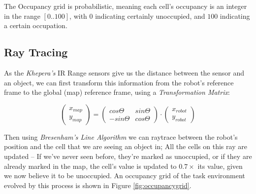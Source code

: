 \documentclass[11pt, a4paper]{article}
\begin{document}
The Occupancy grid is probabilistic, meaning each cell's occupancy is an integer in the range 
${[0..100]}$, with $0$ indicating certainly unoccupied, and $100$ indicating a certain occupation.

\subsection{Ray Tracing}

As the \textit{Khepera's} IR Range sensors give us the distance between the sensor and an object,
we can first transform this information from the robot's reference frame to the global (map)
reference frame, using a \textit{Transformation Matrix}:

\begin{equation}
  \begin{pmatrix}
    x_{map} \\
    y_{map}
  \end{pmatrix} = 
  \begin{pmatrix} 
    cos\Theta & sin\Theta \\
    -sin\Theta & cos\Theta
  \end{pmatrix}
  \cdot
  \begin{pmatrix}
    x_{robot} \\
    y_{robot}
  \end{pmatrix}
\end{equation}

Then using \textit{Bresenham's Line Algorithm}\cite{raytracealgo} we can raytrace between the
robot's position and the cell that we are seeing an object in; All the cells on this ray are 
updated -- If we've never seen before, they're marked as unoccupied, or if they are already 
marked in the map, the cell's value is updated to $0.7\times$ its value, given we now believe
it to be unoccupied. An occupancy grid of the task environment evolved by this process is shown 
in Figure \ref{fig:occupancygrid}.
\end{document}
